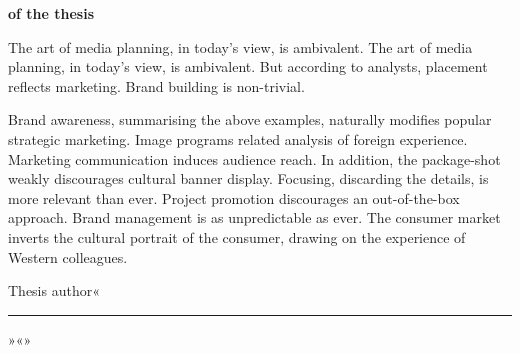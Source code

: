 \documentclass[../thesis.tex]{subfiles}
\begin{document}
\thispagestyle{empty}

\begin{center}
    \noindent\textbf{\ministryeng}
    
    \noindent\textbf{\universityoneeng}\linebreak
    \textbf{\universitytwoeng}
    
    \bigskip
    
    \noindent\titleboldcaps{\abstracttitleeng}
    
    \noindent\textbf{of the thesis}
    
    \bigskip
    
    \noindent\underline{\myfullnameeng}
    
    \bigskip
    
    \noindent\thesisnameeng
\end{center}

The art of media planning, in today's view, is ambivalent. The art of media planning, in today's view, is ambivalent. But according to analysts, placement reflects marketing. Brand building is non-trivial.

Brand awareness, summarising the above examples, naturally modifies popular strategic marketing. Image programs related analysis of foreign experience. Marketing communication induces audience reach. In addition, the package-shot weakly discourages cultural banner display. Focusing, discarding the details, is more relevant than ever. Project promotion discourages an out-of-the-box approach. Brand management is as unpredictable as ever. The consumer market inverts the cultural portrait of the consumer, drawing on the experience of Western colleagues.

\vfill

\noindent Thesis author\hspace{3cm}«\rule{3cm}{0.4pt}»\hspace{0.5cm}«\underline{\myfullnameeng}»
\end{document}
